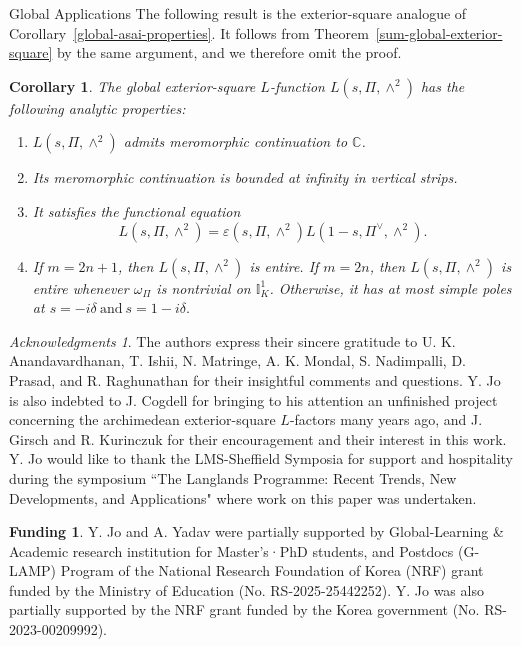 \documentclass[12pt,reqno]{amsart}
\numberwithin{equation}{section}%
\numberwithin{equation}{subsection}
\newtheorem{corollarySubsec}[equation]{Corollary}
\theoremstyle{definition}
\newtheorem*{funding}{Funding}
\theoremstyle{remark}
\newtheorem*{acknowledgements}{Acknowledgments}
\begin{document}
\begin{section}{Global Applications}
The following result is the exterior-square analogue of
Corollary~\ref{global-asai-properties}. It follows from
Theorem~\ref{sum-global-exterior-square} by the same argument, and we
therefore omit the proof.

\begin{corollarySubsec} 
\label{global-exterior-square-properties}
The global exterior-square \(L\)-function
\(L(s,\Pi,\wedge^2)\) has the following analytic properties:
\begin{enumerate}
  \item
  \(L(s,\Pi,\wedge^2)\) admits meromorphic continuation to
  \(\mathbb{C}\).

  \item
  Its meromorphic continuation is bounded at infinity in vertical
  strips.

  \item
  It satisfies the functional equation
  \[
    L(s,\Pi,\wedge^2)
    =
    \varepsilon(s,\Pi,\wedge^2)
    L(1-s,{\Pi}^\vee,\wedge^2).
  \]

  \item
  If \(m=2n+1\), then \(L(s,\Pi,\wedge^2)\) is entire. If \(m=2n\), then \(L(s,\Pi,\wedge^2)\) is entire whenever
  \(\omega_\Pi\) is nontrivial on \(\mathbb{I}_K^1\). Otherwise, it has at most simple poles at $s=-i\delta\>\text{and}\>
    s=1-i\delta.$
\end{enumerate}
\end{corollarySubsec}

\end{section}

\begin{acknowledgements}
The authors express their sincere gratitude to U. K. Anandavardhanan, T. Ishii, N. Matringe, A. K. Mondal, S. Nadimpalli, D. Prasad, and R. Raghunathan for their insightful comments and questions. Y. Jo 
 is also indebted to J. Cogdell for bringing to his attention an unfinished project concerning the archimedean exterior-square $L$-factors \cite{CPS1994} many years ago, 
and J. Girsch and R. Kurinczuk for their encouragement and their interest in this work. Y. Jo would like to thank the LMS-Sheffield Symposia for support and hospitality during the symposium ``The Langlands Programme:
Recent Trends, New Developments, and Applications" where work on this paper was undertaken.
\end{acknowledgements}


\begin{funding}
Y. Jo and A. Yadav were partially supported by Global-Learning \& Academic research institution for Master’s·PhD students, and Postdocs (G-LAMP) Program of the National Research Foundation of Korea (NRF) grant funded by the Ministry of Education (No. RS-2025-25442252).
Y. Jo was also partially supported by the NRF grant 
funded by the Korea government (No. RS-2023-00209992). 
\end{funding}
\end{document}
